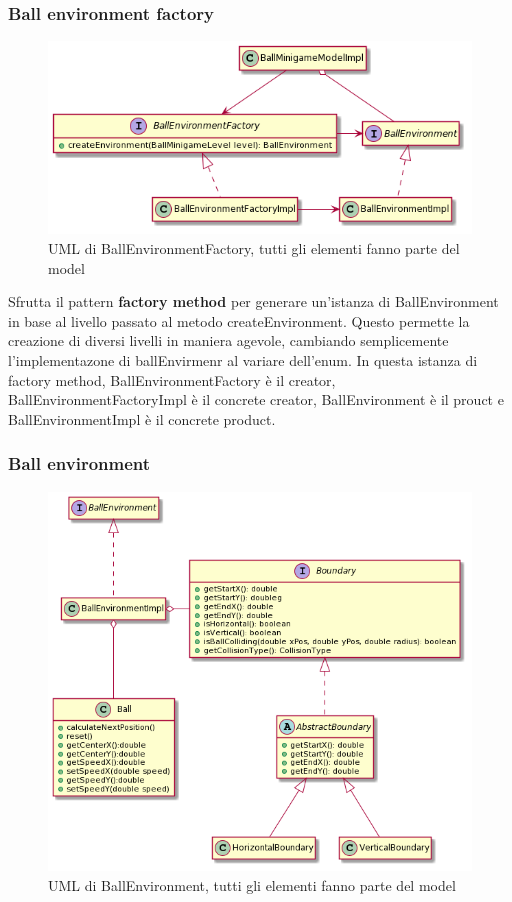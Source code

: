 \documentclass[a4paper,12pt]{report}
\begin{document}
    \subsubsection{Ball environment factory}
    \begin{figure}[h]
    \centering{}
    \includegraphics[width=\textwidth]{images/freddi/BallEnvironmentFactory.png}
    \caption{UML di BallEnvironmentFactory, tutti gli elementi fanno parte del model}
    \end{figure}

    Sfrutta il pattern \textbf{factory method} per generare un'istanza di BallEnvironment in base al livello passato al metodo createEnvironment.
    Questo permette la creazione di diversi livelli in maniera agevole, cambiando semplicemente l'implementazone di ballEnvirmenr al variare dell'enum.
    In questa istanza di factory method, BallEnvironmentFactory è il creator, BallEnvironmentFactoryImpl è il concrete creator, BallEnvironment è il prouct e BallEnvironmentImpl è il concrete product.

    \subsubsection{Ball environment}
    \begin{figure}[h]
    \centering{}
    \includegraphics[width=\textwidth]{images/freddi/BallEnvironment.png}
    \caption{UML di BallEnvironment, tutti gli elementi fanno parte del model}
    \end{figure}
\end{document}

